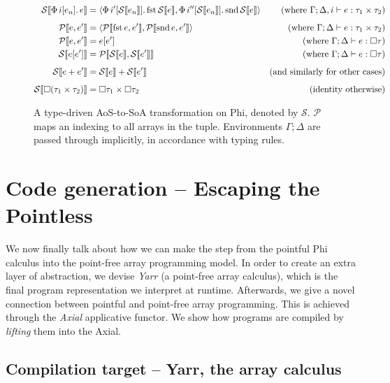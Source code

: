 \begin{figure}[h]
    \centering
    \begin{align*}
\phisoa {\phivec{i}{e_n}{e}}
&= \phipair{\phivec{i'}{\phisoa{e_n}}{\phifst{\phisoa{e}}}}{\phivec{i''}{\phisoa{e_n}}{\phisnd{\phisoa{e}}}}
&\text{(where }\Gamma; \Delta, i \vdash e : \phipairtype{\tau_1}{\tau_2} \text{)} \\[0.5em]
\phitupleindex{e}{e'}
&= \phipair{\phitupleindex{\phifst{e}}{e'}}{\phitupleindex{\phisnd{e}}{e'}}
&\text{(where }\Gamma; \Delta \vdash e : \phipairtype{\tau_1}{\tau_2} \text{)} \\
\phitupleindex{e}{e'}
&= e\left[ e' \right]
&\text{(where }\Gamma; \Delta \vdash e : \phivectype{\tau} \text{)} \\
\phisoa{e[e']}
&= \phitupleindex{\phisoa{e}}{\phisoa{e'}}
&\text{(where }\Gamma; \Delta \vdash e : \phivectype{\tau} \text{)} \\[0.5em]
\phisoa{e + e'}
&= \phisoa{e} + \phisoa{e'}
&\text{(and similarly for other cases)} \\[0.5em]
\phisoa{\phivectype{(\phipairtype{\tau_1}{\tau_2}})} &= \phipairtype{\phivectype{\tau_1}}{\phivectype{\tau_2}} &\text{(identity otherwise)}
    \end{align*}
    \caption{A type-driven AoS-to-SoA transformation on Phi, denoted by $\mathcal S$. $\mathcal P$ maps an indexing to all arrays in the tuple. Environments $\Gamma; \Delta$ are passed through implicitly, in accordance with typing rules.}
    \label{fig:aos-to-soa}
\end{figure}

\section{Code generation -- Escaping the Pointless}
\label{escaping-the-pointless}

We now finally talk about how we can make the step from the pointful Phi calculus into the point-free array programming model. In order to create an extra layer of abstraction, we devise \textit{Yarr} (a point-free array calculus), which is the final program representation we interpret at runtime. Afterwards, we give a novel connection between pointful and point-free array programming. This is achieved through the \textit{Axial} applicative functor. We show how programs are compiled by \textit{lifting} them into the Axial.

\subsection{Compilation target -- Yarr, the array calculus}

